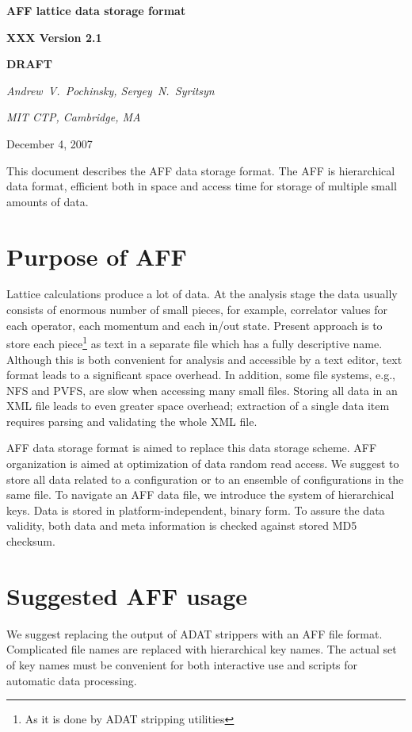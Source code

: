 \documentclass[10pt,letterpaper]{article}
\begin{document}
\centerline{\huge\bf AFF lattice data storage format}
\vspace{15pt}
\centerline{\huge\bf XXX Version 2.1}
\vspace{15pt}
\centerline{\Huge\bf DRAFT}
\vspace{20pt}
\centerline{\it Andrew~V.~Pochinsky, Sergey~N.~Syritsyn}
\centerline{\it MIT CTP, Cambridge, MA}
\vspace{10pt}
\centerline{December 4, 2007}
\vspace{20pt}

\noindent This document describes the AFF data storage format. 
The AFF is hierarchical data format, efficient both in space and access time 
for storage of multiple small amounts of data.

\tableofcontents

\section{Purpose of AFF}
Lattice calculations produce a lot of data. 
At the analysis stage the data usually consists of enormous number of small
pieces, for example, correlator values for
each operator, each momentum and each in/out state.
Present approach is to store each
piece\footnote{As it is done by ADAT stripping utilities}
as text in a separate file which has a fully descriptive name. 
Although this is both convenient for analysis and accessible by a text editor,
text format leads to a significant space overhead. 
In addition, some file systems, e.g., NFS and PVFS, are slow when accessing
many small files. 
Storing all data in an XML file leads to even greater space overhead;
extraction of a single data item requires parsing and validating the
whole XML file.

AFF data storage format is aimed to replace this data storage scheme. 
AFF organization is aimed at optimization of data random read access.
We suggest to store all data related to a configuration or to an ensemble of configurations in
the same file.
To navigate an AFF data file, we introduce the system of hierarchical keys.
Data is stored in platform-independent, binary form.
To assure the data validity, both data and meta information is checked against stored
MD5 checksum.


\section{Suggested AFF usage}

We suggest replacing the output of ADAT strippers with an AFF file format. 
Complicated file names are replaced with hierarchical key names. 
The actual set of key names must be convenient for both interactive use and 
scripts for automatic data processing.
\end{document}
